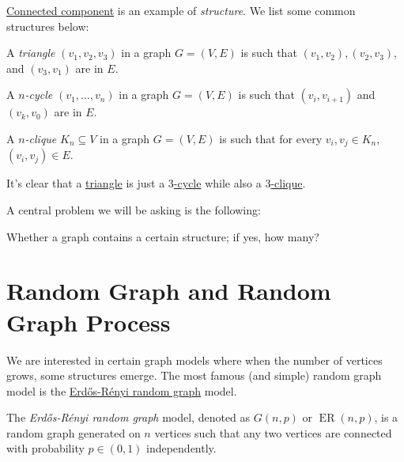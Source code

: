 \hyperref[def:connected-component]{Connected component} is an example of \emph{structure}. We list some common structures below:

\begin{definition}[Triangle]\label{def:triangle}
	A \emph{triangle} \((v_1, v_2, v_3)\) in a graph \(G = (V, E)\) is such that \((v_1, v_2), (v_2, v_3)\), and \((v_3, v_1)\) are in \(E\).
\end{definition}

\begin{definition}[Cycle]\label{def:cycle}
	A \emph{\(n\)-cycle} \((v_1, \dots , v_n)\) in a graph \(G = (V, E)\) is such that \((v_i, v_{i+1})\) and \((v_k, v_0)\) are in \(E\).
\end{definition}

\begin{definition}[Clique]\label{def:clique}
	A \emph{\(n\)-clique} \(K_n \subseteq V\) in a graph \(G = (V, E)\) is such that for every \(v_i, v_j \in K_n\), \((v_i, v_j) \in E\).
\end{definition}

\begin{eg}
	It's clear that a \hyperref[def:triangle]{triangle} is just a \hyperref[def:cycle]{\(3\)-cycle} while also a \hyperref[def:clique]{\(3\)-clique}.
\end{eg}

A central problem we will be asking is the following:

\begin{problem*}
	Whether a graph contains a certain structure; if yes, how many?
\end{problem*}

\section{Random Graph and Random Graph Process}
We are interested in certain graph models where when the number of vertices grows, some structures emerge. The most famous (and simple) random graph model is the \hyperref[def:Erdős-Rényi-random-graph]{Erdős-Rényi random graph} model.

\begin{definition}\label{def:Erdős-Rényi-random-graph}
	The \emph{Erdős-Rényi random graph} model, denoted as \(G(n, p)\) or \(\operatorname{ER}(n, p) \), is a random graph generated on \(n\) vertices such that any two vertices are connected with probability \(p \in (0, 1)\) independently.
\end{definition}

